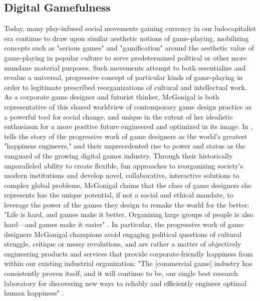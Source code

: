 \subsection*{Digital Gamefulness}
Today, many play-infused social movements gaining currency in our ludocapitalist era continue to draw upon similar aesthetic notions of game-playing, mobilizing concepts such as "serious games" and "gamification" around the aesthetic value of game-playing in popular culture to serve predetermined political or other more mundane material purposes. Such movements attempt to both essentialize and revalue a universal, progressive concept of particular kinds of game-playing in order to legitimate prescribed reorganizations of cultural and intellectual work. As a corporate game designer and futurist thinker, McGonigal is both representative of this shared worldview of contemporary game design practice as a powerful tool for social change, and unique in the extent of her idealistic enthusiasm for a more positive future engineered and optimized in its image. In , \citeauthor{McGonigal2011} tells the story of the progressive work of game designers as the world's greatest "happiness engineers," and their unprecedented rise to power and status as the vanguard of the growing digital games industry. Through their historically unparalleled ability to create flexible, fun approaches to reorganizing society's modern institutions and develop novel, collaborative, interactive solutions to complex global problems, McGonigal claims that the class of game designers she represents has the unique potential, if not a social and ethical mandate, to leverage the power of the games they design to remake the world for the better: "Life is hard, and games make it better. Organizing large groups of people is also hard---and games make it easier" \autocite[Conclusion]{McGonigal2011}. In particular, the progressive work of game designers McGonigal champions avoid engaging political questions of cultural struggle, critique or messy revolutions, and are rather a matter of objectively engineering products and services that provide corporate-friendly happiness from within our existing industrial organization: "The [commercial game] industry has consistently proven itself, and it will continue to be, our single best research laboratory for discovering new ways to reliably and efficiently engineer optimal human happiness" \autocite[Conclusion]{McGonigal2011}.

